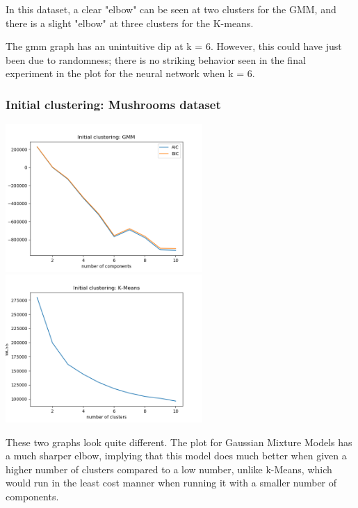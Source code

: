 \documentclass[11pt]{article}
\begin{document}
            In this dataset, a clear "elbow" can be seen at two clusters for the GMM,
            and there is a slight "elbow" at three clusters for the K-means.

            The gmm graph has an unintuitive dip at k = 6. However, this could
            have just been due to randomness; there is no striking behavior seen
            in the final experiment in the plot for the neural network when k = 6.
            

            \subsubsection{Initial clustering: Mushrooms dataset}

            \includegraphics[width=7.5cm]{../mushrooms/clustering1/gmm_init.png}
            \includegraphics[width=7.5cm]{../mushrooms/clustering1/km_init.png}

            These two graphs look quite different. The plot for Gaussian Mixture
            Models has a much sharper elbow, implying that this model does much
            better when given a higher number of clusters compared to a low number,
            unlike k-Means, which would run in the least cost manner when running
            it with a smaller number of components.
\end{document}
